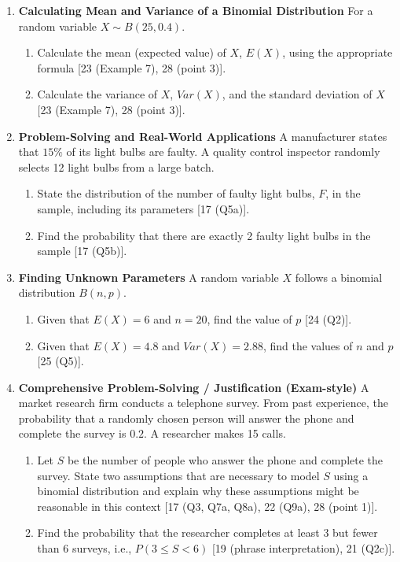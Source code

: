 \documentclass[12pt]{article}
\begin{document}
\begin{enumerate}
    \item \textbf{Calculating Mean and Variance of a Binomial Distribution}
    For a random variable $X \sim B(25, 0.4)$.
    \begin{enumerate}
        \item Calculate the mean (expected value) of $X$, $E(X)$, using the appropriate formula [23 (Example 7), 28 (point 3)].
        \item Calculate the variance of $X$, $Var(X)$, and the standard deviation of $X$ [23 (Example 7), 28 (point 3)].
    \end{enumerate}

    \item \textbf{Problem-Solving and Real-World Applications}
    A manufacturer states that $15\%$ of its light bulbs are faulty. A quality control inspector randomly selects 12 light bulbs from a large batch.
    \begin{enumerate}
        \item State the distribution of the number of faulty light bulbs, $F$, in the sample, including its parameters [17 (Q5a)].
        \item Find the probability that there are exactly 2 faulty light bulbs in the sample [17 (Q5b)].
    \end{enumerate}

    \item \textbf{Finding Unknown Parameters}
    A random variable $X$ follows a binomial distribution $B(n, p)$.
    \begin{enumerate}
        \item Given that $E(X) = 6$ and $n=20$, find the value of $p$ [24 (Q2)].
        \item Given that $E(X) = 4.8$ and $Var(X) = 2.88$, find the values of $n$ and $p$ [25 (Q5)].
    \end{enumerate}

    \item \textbf{Comprehensive Problem-Solving / Justification (Exam-style)}
    A market research firm conducts a telephone survey. From past experience, the probability that a randomly chosen person will answer the phone and complete the survey is $0.2$. A researcher makes 15 calls.
    \begin{enumerate}
        \item Let $S$ be the number of people who answer the phone and complete the survey. State two assumptions that are necessary to model $S$ using a binomial distribution and explain why these assumptions might be reasonable in this context [17 (Q3, Q7a, Q8a), 22 (Q9a), 28 (point 1)].
        \item Find the probability that the researcher completes at least 3 but fewer than 6 surveys, i.e., $P(3 \le S < 6)$ [19 (phrase interpretation), 21 (Q2c)].
    \end{enumerate}
\end{enumerate}
\end{document}

